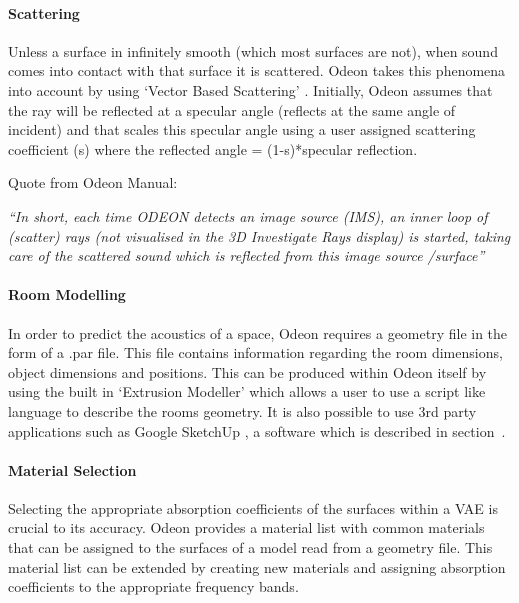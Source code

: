 \documentclass[../../main.tex]{subfiles}
\begin{document}
		\paragraph{Scattering}
		\label{background:scattering}	

			Unless a surface in infinitely smooth (which most surfaces are not), when sound comes into contact with that surface it is scattered. Odeon takes this phenomena into account by using `Vector Based Scattering' \cite{odeonManual}. Initially, Odeon assumes that the ray will be reflected at a specular angle (reflects at the same angle of incident) and that scales this specular angle using a user assigned scattering coefficient (s) where the reflected angle = (1-s)*specular reflection.

			Quote from Odeon Manual:	

			 \vspace{5mm}
		 \begin{center}
		 \begin{minipage}{0.5\textwidth}
		 \textit{``In short, each time ODEON detects an image source (IMS), an inner loop of (scatter) rays (not visualised in the 3D Investigate Rays display) is started, taking care of the scattered sound which is reflected from this image source /surface''}
		 \end{minipage}
		 \end{center}
		 \vspace{5mm}

		\paragraph{Room Modelling}

			In order to predict the acoustics of a space, Odeon requires a geometry file in the form of a .par file. This file contains information regarding the room dimensions, object dimensions and positions. This can be produced within Odeon itself by using the built in `Extrusion Modeller' which allows a user to use a script like language to describe the rooms geometry. It is also possible to use 3rd party applications such as Google SketchUp \cite{SKU}, a software which is described in section~.

		\paragraph{Material Selection}
			Selecting the appropriate absorption coefficients of the surfaces within a \ac{VAE} is crucial to its accuracy. Odeon provides a material list with common materials that can be assigned to the surfaces of a model read from a geometry file. This material list can be extended by creating new materials and assigning absorption coefficients to the appropriate frequency bands.
\end{document}
